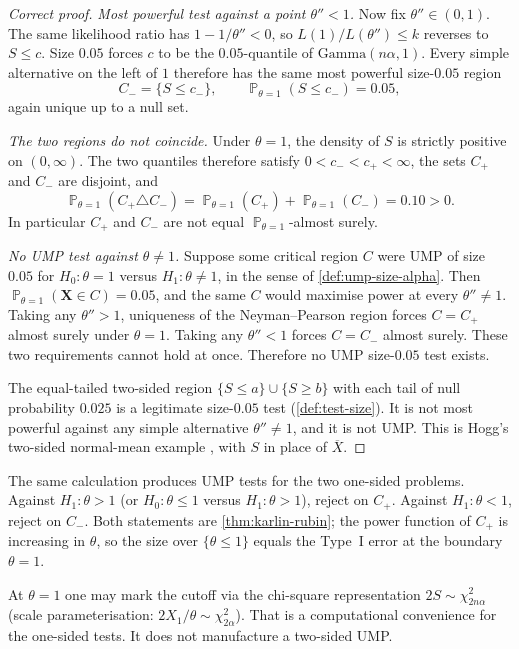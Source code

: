 \documentclass[11pt,a4paper]{article}
\DeclareMathOperator{\Pbb}{\mathbb{P}}
\begin{document}
\begin{proof}[Correct proof]
\emph{Most powerful test against a point \( \theta''<1 \).}
Now fix \( \theta''\in(0,1) \). The same likelihood ratio has \( 1-1/\theta''<0 \), so \( L(1)/L(\theta'')\le k \) reverses to \( S\le c \). Size \( 0.05 \) forces \( c \) to be the \( 0.05 \)-quantile of \( \mathrm{Gamma}(n\alpha,1) \). Every simple alternative on the left of \( 1 \) therefore has the same most powerful size-\( 0.05 \) region
\[
C_-
=
\{S\le c_-\},
\qquad
\Pbb_{\theta=1}(S\le c_-)
=
0.05,
\]
again unique up to a null set.

\emph{The two regions do not coincide.}
Under \( \theta=1 \), the density of \( S \) is strictly positive on \( (0,\infty) \). The two quantiles therefore satisfy \( 0<c_-<c_+<\infty \), the sets \( C_+ \) and \( C_- \) are disjoint, and
\[
\Pbb_{\theta=1}(C_+\triangle C_-)
=
\Pbb_{\theta=1}(C_+)
+
\Pbb_{\theta=1}(C_-)
=
0.10
>
0.
\]
In particular \( C_+ \) and \( C_- \) are not equal \( \Pbb_{\theta=1} \)-almost surely.

\emph{No UMP test against \( \theta\neq 1 \).}
Suppose some critical region \( C \) were UMP of size \( 0.05 \) for \( H_0:\theta=1 \) versus \( H_1:\theta\neq 1 \), in the sense of \cref{def:ump-size-alpha}. Then \( \Pbb_{\theta=1}(\mathbf{X}\in C)=0.05 \), and the same \( C \) would maximise power at every \( \theta''\neq 1 \). Taking any \( \theta''>1 \), uniqueness of the Neyman--Pearson region forces \( C=C_+ \) almost surely under \( \theta=1 \). Taking any \( \theta''<1 \) forces \( C=C_- \) almost surely. These two requirements cannot hold at once. Therefore no UMP size-\( 0.05 \) test exists.

The equal-tailed two-sided region \( \{S\le a\}\cup\{S\ge b\} \) with each tail of null probability \( 0.025 \) is a legitimate size-\( 0.05 \) test (\cref{def:test-size}). It is not most powerful against any simple alternative \( \theta''\neq 1 \), and it is not UMP. This is Hogg's two-sided normal-mean example \citep[Example~8.2.3]{hogg2019}, with \( S \) in place of \( \overline{X} \).
\end{proof}

\begin{remark}
\label{rem:p8a-onesided}
The same calculation produces UMP tests for the two one-sided problems. Against \( H_1:\theta>1 \) (or \( H_0:\theta\le 1 \) versus \( H_1:\theta>1 \)), reject on \( C_+ \). Against \( H_1:\theta<1 \), reject on \( C_- \). Both statements are \cref{thm:karlin-rubin}; the power function of \( C_+ \) is increasing in \( \theta \), so the size over \( \{\theta\le 1\} \) equals the Type~I error at the boundary \( \theta=1 \).

At \( \theta=1 \) one may mark the cutoff via the chi-square representation \( 2S\sim\chi^{2}_{2n\alpha} \) (scale parameterisation: \( 2X_1/\theta\sim\chi^{2}_{2\alpha} \)). That is a computational convenience for the one-sided tests. It does not manufacture a two-sided UMP.
\end{remark}
\end{document}

